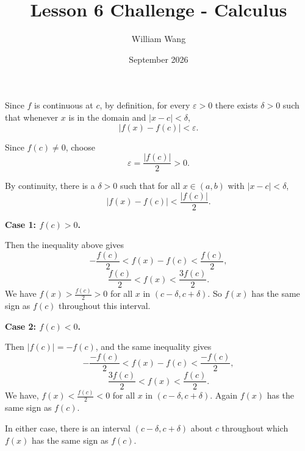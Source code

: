 \documentclass{article}
\title{Lesson 6 Challenge - Calculus}
\author{William Wang}
\date{September 2026}
\begin{document}
\maketitle
Since $f$ is continuous at $c$, by definition, for every $\varepsilon > 0$ there exists $\delta > 0$ such that whenever $x$ is in the domain and $|x-c| < \delta$,
\[
|f(x) - f(c)| < \varepsilon.
\]

Since $f(c) \neq 0$, choose
\[
\varepsilon = \frac{|f(c)|}{2} > 0.
\]

By continuity, there is a $\delta > 0$ such that for all $x \in (a,b)$ with $|x - c| < \delta$,
\[
|f(x) - f(c)| < \frac{|f(c)|}{2}.
\]

\textbf{Case 1: $f(c) > 0$.}

Then the inequality above gives
\[
-\frac{f(c)}{2} < f(x) - f(c) < \frac{f(c)}{2},
\]
\[
\frac{f(c)}{2} < f(x) < \frac{3f(c)}{2}.
\]
We have $f(x) > \frac{f(c)}{2} > 0$ for all $x$ in $(c-\delta, c+\delta)$. So $f(x)$ has the same sign as $f(c)$ throughout this interval.

\textbf{Case 2: $f(c) < 0$.}

Then $|f(c)| = -f(c)$, and the same inequality gives
\[
-\frac{-f(c)}{2} < f(x) - f(c) < \frac{-f(c)}{2},
\]
\[
\frac{3f(c)}{2} < f(x) < \frac{f(c)}{2}.\]
We have, $f(x) < \frac{f(c)}{2} < 0$ for all $x$ in $(c - \delta, c+\delta)$. Again $f(x)$ has the same sign as $f(c)$.

In either case, there is an interval $(c-\delta, c+\delta)$ about $c$ throughout which $f(x)$ has the same sign as $f(c)$.
\end{document}
